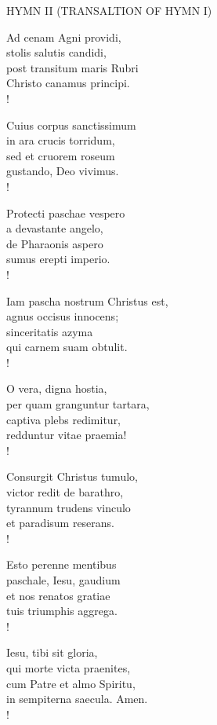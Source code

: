 \noindent\small{\uppercase{Hymn II (transaltion of hymn I)}}\normalsize
\begin{cverse}
Ad cenam Agni providi,\\
stolis salutis candidi,\\
post transitum maris Rubri\\
Christo canamus principi.\\!

Cuius corpus sanctissimum\\
in ara crucis torridum,\\
sed et cruorem roseum\\
gustando, Deo vivimus.\\!

Protecti paschae vespero\\
a devastante angelo,\\
de Pharaonis aspero\\
sumus erepti imperio.\\!

Iam pascha nostrum Christus est,\\
agnus occisus innocens;\\
sinceritatis azyma\\
qui carnem suam obtulit.\\!

O vera, digna hostia,\\
per quam granguntur tartara,\\
captiva plebs redimitur,\\
redduntur vitae praemia!\\!

Consurgit Christus tumulo,\\
victor redit de barathro,\\
tyrannum trudens vinculo\\
et paradisum reserans.\\!

Esto perenne mentibus\\
paschale, Iesu, gaudium\\
et nos renatos gratiae\\
tuis triumphis aggrega.\\!

Iesu, tibi sit gloria,\\
qui morte victa praenites,\\
cum Patre et almo Spiritu,\\
in sempiterna saecula. Amen.\\!
\end{cverse}

